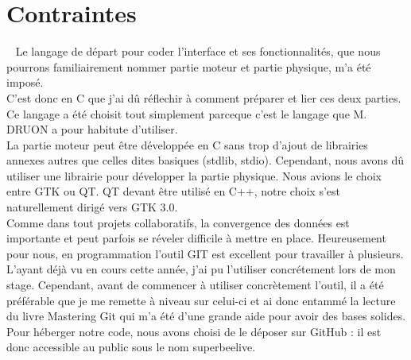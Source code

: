 \documentclass[11pt,french,a4paper]{report}
\begin{document}
    \section{Contraintes} 
Le langage de départ pour coder l'interface et ses fonctionnalités, que nous pourrons familiairement nommer partie moteur et partie physique, m'a été imposé. \\
C'est donc en C que j'ai dû réflechir à comment préparer et lier ces deux parties. Ce langage a été choisit tout simplement parceque c'est 
le langage que M. DRUON a pour habitute d'utiliser. \\
La partie moteur peut être développée en C sans trop d'ajout de librairies annexes autres que celles dites basiques (stdlib, stdio). Cependant, 
nous avons dû utiliser une librairie pour développer la partie physique. Nous avions le choix entre GTK ou QT. QT devant être utilisé en C++, 
notre choix s'est naturellement dirigé vers GTK 3.0. \\
Comme dans tout projets collaboratifs, la convergence des données est importante et peut parfois se réveler difficile à mettre en place. 
Heureusement pour nous, en programmation l'outil GIT est excellent pour travailler à plusieurs. L'ayant déjà vu en cours cette année, j'ai pu l'utiliser 
concrétement lors de mon stage. Cependant, avant de commencer à utiliser concrètement l'outil, il a été préférable que je me remette à niveau sur celui-ci
et ai donc entammé la lecture du livre Mastering Git %
qui m'a été d'une grande aide pour avoir des bases solides. Pour héberger notre code, nous avons choisi de le déposer sur GitHub : il est donc accessible au 
public sous le nom superbeelive. 
\end{document}
